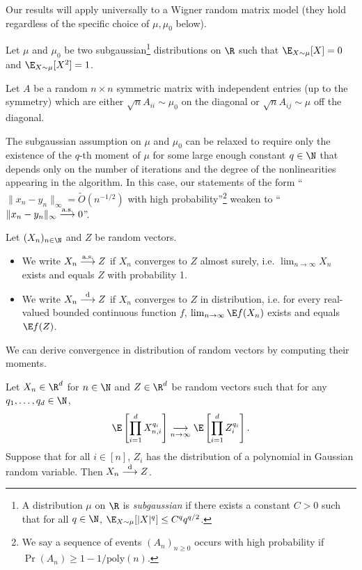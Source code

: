 \documentclass[12pt]{article}
\renewcommand{\toas}{\overset{\textnormal{a.s.}}{\longrightarrow}}
\renewcommand{\tod}{\overset{\textnormal{d}}{\longrightarrow}}
\begin{document}
Our results will apply universally to a Wigner random matrix model (they hold regardless
of the specific choice of $\mu, \mu_0$ below).

\begin{assumption}
\label{assump:A-entries}
    Let $\mu$ and $\mu_0$ be two subgaussian\footnote{A distribution $\mu$ on $\R$ is \emph{subgaussian} if there exists a constant $C > 0$ such that for all $q \in \N$, $\E_{X \sim \mu}[|X|^q] \leq C^q q^{q/2}$.} distributions on $\R$ such that $\E_{X \sim \mu}[X] = 0$ and $\E_{X \sim \mu}[X^2] = 1$.
    
    Let $A$ be a random $n\times n$ symmetric matrix with independent entries (up to the symmetry) which are either $\sqrt{n} A_{ii} \sim \mu_0$ on the diagonal or $\sqrt{n} A_{ij} \sim \mu$
    off the diagonal.
\end{assumption}

The subgaussian assumption on
$\mu$ and $\mu_0$ can be relaxed to require
only the existence of the
$q$-th moment of $\mu$ for some 
large enough constant
$q\in \N$ that depends only 
on the number of iterations
and the degree of the nonlinearities appearing
in the algorithm. In this case, our statements
of the form ``$\|x_n-y_n\|_\infty=\widetilde O(n^{-1/2})$ with high probability''\footnote{We say a
sequence of events $(A_n)_{n\ge 0}$ occurs with high probability if $\Pr(A_n)\ge 1-1/\text{poly}(n)$.} weaken to ``$\|x_n-y_n\|_\infty\toas 0$''.


\begin{definition}
    Let $(X_n)_{n\in \N}$ and $Z$ be random vectors. 
    \begin{itemize}
        \item We write $X_n\toas Z$ if $X_n$ converges to $Z$ almost surely, i.e. $\lim_{n \to \infty}X_n$ exists and equals $Z$ with probability 1.
        \item We write $X_n\tod Z$ if $X_n$ converges to $Z$ in distribution, i.e. for every real-valued bounded continuous function $f$, $\lim_{n\to\infty} \E f (X_n)$ exists and equals $\E f(Z)$.
    \end{itemize}
\end{definition}

We can derive convergence in distribution 
of random vectors by computing their
moments.

\begin{lemma}
\label{lem:method-of-moments}
    Let $X_n\in\R^d$ for $n\in \N$ and $Z\in\R^d$ be random
    vectors such that for any $q_1,\ldots,q_d\in\N$,
    \[
        \E \left[\prod_{i=1}^d X_{n,i}^{q_i}\right]\underset{n\to\infty}{\longrightarrow} \E \left[\prod_{i=1}^d Z_i^{q_i}\right].
    \]
    Suppose that for all $i\in [n]$, $Z_i$ 
    has the distribution of a polynomial in
    Gaussian random variable. Then $X_n\tod Z$.  
\end{lemma}
\end{document}
